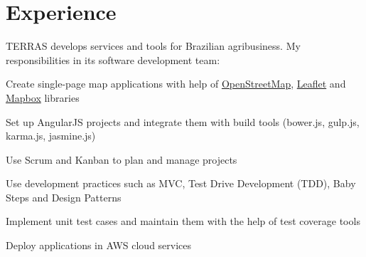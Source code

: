 \documentclass[]{joaosoares-resume}
\begin{document}
\hfill
\begin{minipage}[t]{0.64\textwidth}

\section{Experience}
{\justifying TERRAS develops services and tools for Brazilian agribusiness. My responsibilities in its software development team:\par} 
\sectionsep
\begin{tightemize}
\item Create single-page map applications with help of \href{https://www.openstreetmap.org}{OpenStreetMap}, \href{http://leafletjs.com}{Leaflet} and \href{https://www.mapbox.com}{Mapbox} libraries 
\item Set up AngularJS projects and integrate them with build tools (bower.js, gulp.js, karma.js, jasmine.js)
\item Use Scrum and Kanban to plan and manage projects
\item Use development practices such as MVC, Test Drive Development (TDD), Baby Steps and Design Patterns
\item Implement unit test cases and maintain them with the help of test coverage tools
\item Deploy applications in AWS cloud services 
\end{tightemize}

\sectionsep


\end{minipage}
\end{document}
